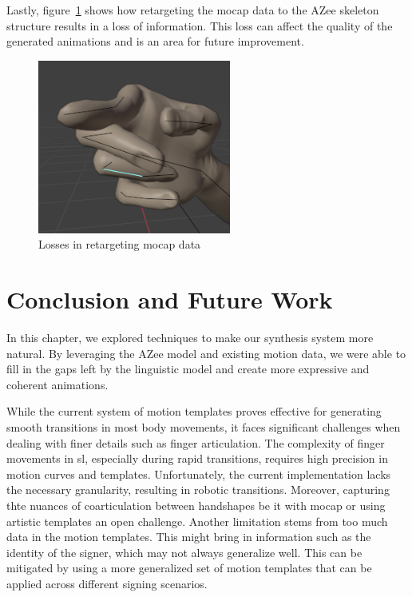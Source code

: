 \documentclass[../../main.tex]{subfiles}
\begin{document}
Lastly, figure~\ref{fig:losses} shows how retargeting the \gls{mocap} data to the AZee skeleton structure results in a loss of information. This loss can affect the quality of the generated animations and is an area for future improvement.

\begin{figure}
  \centering \includegraphics[width = 2.5in]{chapters/intermediate_blocks_pose_correction/images/losses.png}
  \caption{Losses in retargeting mocap data}
  \label{fig:losses}
\end{figure}

\section{Conclusion and Future Work}
\label{ch:intermediate_blocks_pose_correction:conclusion_and_future_work}

In this chapter, we explored techniques to make our synthesis system more natural. By leveraging the AZee model and existing motion data, we were able to fill in the gaps left by the linguistic model and create more expressive and coherent animations. 

While the current system of motion templates proves effective for generating smooth transitions in most body movements, it faces significant challenges when dealing with finer details such as finger articulation. The complexity of finger movements in \gls{sl}, especially during rapid transitions, requires high precision in motion curves and templates. Unfortunately, the current implementation lacks the necessary granularity, resulting in robotic transitions. Moreover, capturing thte nuances of coarticulation between handshapes be it with \gls{mocap} or using artistic templates an open challenge. Another limitation stems from too much data in the motion templates. This might bring in information such as the identity of the signer, which may not always generalize well. This can be mitigated by using a more generalized set of motion templates that can be applied across different signing scenarios.
\end{document}
